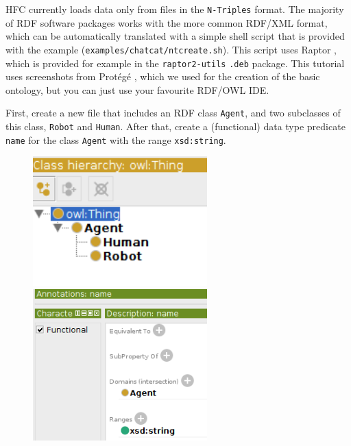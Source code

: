 HFC currently loads data only from files in the \texttt{N-Triples} format. The
majority of RDF software packages works with the more common RDF/XML format,
which can be automatically translated with a simple shell script that is
provided with the example (\texttt{examples/chatcat/ntcreate.sh}). This script
uses Raptor \citep{raptor}, which is provided for example in the
\texttt{raptor2-utils} \texttt{.deb} package. This tutorial uses screenshots
from Protégé \citep{Protege}, which we used for the creation of the basic
ontology, but you can just use your favourite RDF/OWL IDE.

First, create a new file that includes an RDF class \texttt{Agent}, and two
subclasses of this class, \texttt{Robot} and \texttt{Human}. After that, create
a (functional) data type predicate \texttt{name} for the class \texttt{Agent}
with the range \texttt{xsd:string}.

\begin{figure}[htb]
  \center
  \begin{minipage}{0.45\textwidth}
    \centering
    \includegraphics[width=0.6\textwidth]{Images/doc_protege.png}
  \end{minipage}\hfill
  \begin{minipage}{0.45\textwidth}
    \centering
    \includegraphics[width=0.6\textwidth]{Images/doc_protege2.png}
  \end{minipage}
\end{figure}

